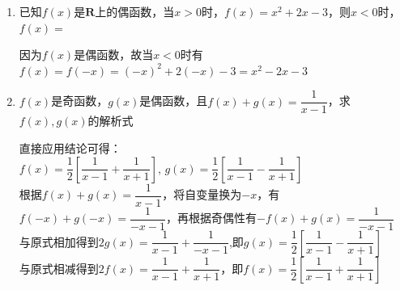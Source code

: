 \begin{enumerate}
    \item 已知$f(x)$是$\mathbf{R}$上的偶函数，当$x > 0$时，$f(x) = x^2+2x-3$，则$x < 0$时，$f(x) = $
    \begin{jieda}
        因为$f(x)$是偶函数，故当$x < 0$时有$f(x) = f(-x) = (-x)^2 + 2(-x) - 3 = x^2 - 2x - 3$
    \end{jieda}
    \item $f(x)$是奇函数，$g(x)$是偶函数，且$f(x) + g(x) = \dfrac{1}{x-1}$，求$f(x), g(x)$的解析式
    \begin{jieda}
        直接应用结论可得：\\
        $f(x) = \dfrac{1}{2}\left[\dfrac{1}{x-1} + \dfrac{1}{x+1}\right]$, $g(x) = \dfrac{1}{2}\left[\dfrac{1}{x-1} - \dfrac{1}{x+1}\right]$ \\
        
        根据$f(x) + g(x) = \dfrac{1}{x-1}$，将自变量换为$-x$，有$f(-x) + g(-x) = \dfrac{1}{-x-1}$，再根据奇偶性有$-f(x) + g(x) = \dfrac{1}{-x-1}$ \\
        与原式相加得到$2g(x) = \dfrac{1}{x-1} + \dfrac{1}{-x-1}$,即$g(x) = \dfrac{1}{2}\left[\dfrac{1}{x-1} - \dfrac{1}{x+1}\right]$ \\
        与原式相减得到$2f(x) = \dfrac{1}{x-1} + \dfrac{1}{x+1}$，即$f(x) = \dfrac{1}{2}\left[\dfrac{1}{x-1} + \dfrac{1}{x+1}\right]$
    \end{jieda}
\end{enumerate}


